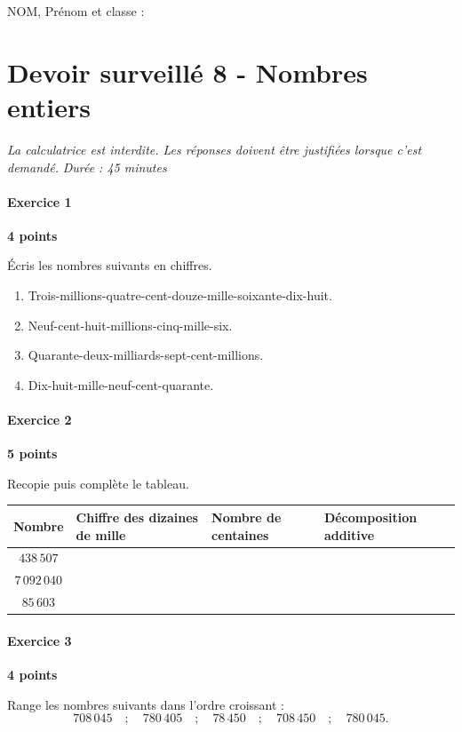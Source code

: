 \documentclass[a4paper,10pt]{report}
\begin{document}
\pagestyle{empty}
\noindent NOM, Prénom et classe : \dotfill

\section*{Devoir surveillé 8 - Nombres entiers}
\noindent\textit{La calculatrice est interdite. Les réponses doivent être justifiées lorsque c'est demandé.} \hfill \textit{Durée : 45 minutes}

\medskip
\paragraph{Exercice 1} \hfill \textbf{4 points}

\noindent Écris les nombres suivants en chiffres.
\begin{enumerate}
\item Trois-millions-quatre-cent-douze-mille-soixante-dix-huit.
\item Neuf-cent-huit-millions-cinq-mille-six.
\item Quarante-deux-milliards-sept-cent-millions.
\item Dix-huit-mille-neuf-cent-quarante.
\end{enumerate}

\medskip
\paragraph{Exercice 2} \hfill \textbf{5 points}

\noindent Recopie puis complète le tableau.
\begin{center}
\renewcommand{\arraystretch}{1.4}
\begin{tabularx}{\linewidth}{|c|X|X|X|}
\hline
Nombre & Chiffre des dizaines de mille & Nombre de centaines & Décomposition additive\\\hline
$438\,507$ & & & \\\hline
$7\,092\,040$ & & & \\\hline
$85\,603$ & & & \\\hline
\end{tabularx}
\end{center}

\medskip
\paragraph{Exercice 3} \hfill \textbf{4 points}

\noindent Range les nombres suivants dans l'ordre croissant :
\[
708\,045 \quad ; \quad 780\,405 \quad ; \quad 78\,450 \quad ; \quad 708\,450 \quad ; \quad 780\,045.
\]
\end{document}
